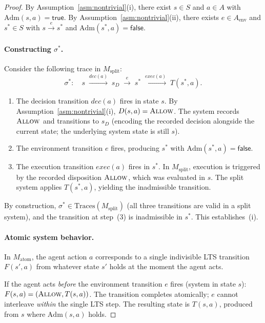 \documentclass[11pt]{article}
\theoremstyle{plain}
\theoremstyle{definition}
\theoremstyle{remark}
\newcommand{\Allow}{\textsc{Allow}}
\newcommand{\Adm}{\mathrm{Adm}}
\newcommand{\Traces}{\mathrm{Traces}}
\begin{document}
\begin{proof}
By Assumption~\ref{asm:nontrivial}(i), there exist $s \in S$ and $a \in A$
with $\Adm(s, a) = \mathsf{true}$.  By Assumption~\ref{asm:nontrivial}(ii),
there exists $e \in A_{\mathrm{env}}$ and $s^* \in S$ with $s \xrightarrow{e}
s^*$ and $\Adm(s^*, a) = \mathsf{false}$.

\paragraph{Constructing $\sigma^*$.}
Consider the following trace in $M_{\mathrm{split}}$:
\[
  \sigma^* :\quad
  s \;\xrightarrow{\mathit{dec}(a)}\; s_D
    \;\xrightarrow{e}\; s^*
    \;\xrightarrow{\mathit{exec}(a)}\; T(s^*, a).
\]
\begin{enumerate}
  \item The decision transition $\mathit{dec}(a)$ fires in state $s$.  By
    Assumption~\ref{asm:nontrivial}(i), $D(s, a) = \Allow$.  The system
    records $\Allow$ and transitions to $s_D$ (encoding the recorded decision
    alongside the current state; the underlying system state is still $s$).

  \item The environment transition $e$ fires, producing $s^*$ with
    $\Adm(s^*, a) = \mathsf{false}$.

  \item The execution transition $\mathit{exec}(a)$ fires in $s^*$.  In
    $M_{\mathrm{split}}$, execution is triggered by the recorded disposition
    $\Allow$, which was evaluated in $s$.  The split system applies
    $T(s^*, a)$, yielding the inadmissible transition.
\end{enumerate}

By construction, $\sigma^* \in \Traces(M_{\mathrm{split}})$ (all three
transitions are valid in a split system), and the transition at step~(3) is
inadmissible in $s^*$.  This establishes~(i).

\paragraph{Atomic system behavior.}
In $M_{\mathrm{atom}}$, the agent action $a$ corresponds to a single
indivisible LTS transition $F(s', a)$ from whatever state $s'$ holds at the
moment the agent acts.

If the agent acts \emph{before} the environment transition $e$ fires (system
in state $s$): $F(s, a) = (\Allow, T(s, a))$.  The transition completes
atomically; $e$ cannot interleave \emph{within} the single LTS step.  The
resulting state is $T(s, a)$, produced from $s$ where $\Adm(s, a)$ holds.


\end{proof}
\end{document}

